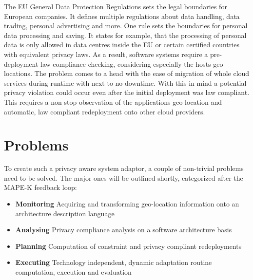 The EU General Data Protection Regulations sets the legal boundaries for European companies. It defines multiple regulations about data handling, data trading, personal advertising and more. One rule sets the boundaries for personal data processing and saving. It states for example, that the processing of personal data is only allowed in data centres inside the EU or certain certified countries with equivalent privacy laws. As a result, software systems require a pre-deployment law compliance checking, considering especially the hosts geo-locations. The problem comes to a head with the ease of migration of whole cloud services during runtime with next to no downtime. With this in mind a potential privacy violation could occur even after the initial deployment was law compliant. This requires a non-stop observation of the applications geo-location and automatic, law compliant redeployment onto other cloud providers.


\section{Problems}
\label{sec:Introduction:problems}

To create such a privacy aware system adaptor, a couple of non-trivial problems need to be solved. The major ones will be outlined shortly, categorized after the MAPE-K feedback loop:

\begin{itemize}
	\setlength\itemsep{0em}
	\item \textbf{Monitoring}\newline
	Acquiring and transforming geo-location information onto an architecture description language
	\item \textbf{Analysing}\newline
	Privacy compliance analysis on a software architecture basis
	\item \textbf{Planning}\newline
	Computation of constraint and privacy compliant redeployments
	\item \textbf{Executing}\newline
	Technology independent, dynamic adaptation routine computation, execution and evaluation
\end{itemize}


